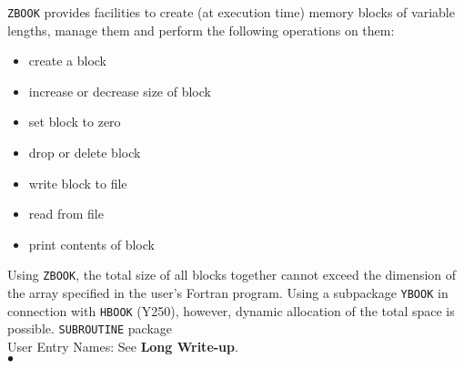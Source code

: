                         
                            
\Submitter{}                             
                      
\begin{center}
\end{center}
{\tt ZBOOK} provides facilities to create (at execution time) memory
blocks of variable lengths, manage them and perform the following
operations on them:
\begin{itemize}
\item  create a block
\item  increase or decrease size of block
\item  set block to zero
\item  drop or delete block
\item  write block to file
\item  read from file
\item  print contents of block
\end{itemize}
Using {\tt ZBOOK}, the total size of all blocks together cannot exceed
the dimension of the array specified in the user's Fortran program.
Using a subpackage {\tt YBOOK} in connection with {\tt HBOOK} (Y250),
however, dynamic allocation of the total space is possible.
\Structure
{\tt SUBROUTINE} package \\
User Entry Names: 
\Usage
See {\bf Long Write-up}.
\\ $\bullet$

